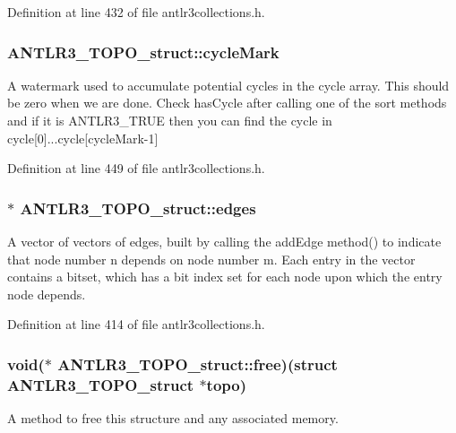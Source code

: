 Definition at line 432 of file antlr3collections.\-h.

\hypertarget{struct_a_n_t_l_r3___t_o_p_o__struct_a5ea68d5a04d801efebcbe00f700fae8b}{
\subsubsection[{cycle\-Mark}]{ A\-N\-T\-L\-R3\-\_\-\-T\-O\-P\-O\-\_\-struct\-::cycle\-Mark}}\label{struct_a_n_t_l_r3___t_o_p_o__struct_a5ea68d5a04d801efebcbe00f700fae8b}
A watermark used to accumulate potential cycles in the cycle array. This should be zero when we are done. Check has\-Cycle after calling one of the sort methods and if it is A\-N\-T\-L\-R3\-\_\-\-T\-R\-U\-E then you can find the cycle in cycle\mbox{[}0\mbox{]}...cycle\mbox{[}cycle\-Mark-\/1\mbox{]} 

Definition at line 449 of file antlr3collections.\-h.

\hypertarget{struct_a_n_t_l_r3___t_o_p_o__struct_afa57fd633eb1fc880e1ed3134f9a565e}{
\subsubsection[{edges}]{$\ast$ A\-N\-T\-L\-R3\-\_\-\-T\-O\-P\-O\-\_\-struct\-::edges}}\label{struct_a_n_t_l_r3___t_o_p_o__struct_afa57fd633eb1fc880e1ed3134f9a565e}
A vector of vectors of edges, built by calling the add\-Edge method() to indicate that node number n depends on node number m. Each entry in the vector contains a bitset, which has a bit index set for each node upon which the entry node depends. 

Definition at line 414 of file antlr3collections.\-h.

\hypertarget{struct_a_n_t_l_r3___t_o_p_o__struct_a6ff84907fd59bf0bb1eacbb6b6dbbd5e}{
\subsubsection[{free}]{\setlength{\rightskip}{0pt plus 5cm}void($\ast$ A\-N\-T\-L\-R3\-\_\-\-T\-O\-P\-O\-\_\-struct\-::free)(struct {\bf A\-N\-T\-L\-R3\-\_\-\-T\-O\-P\-O\-\_\-struct} $\ast$topo)}}\label{struct_a_n_t_l_r3___t_o_p_o__struct_a6ff84907fd59bf0bb1eacbb6b6dbbd5e}
A method to free this structure and any associated memory. 

